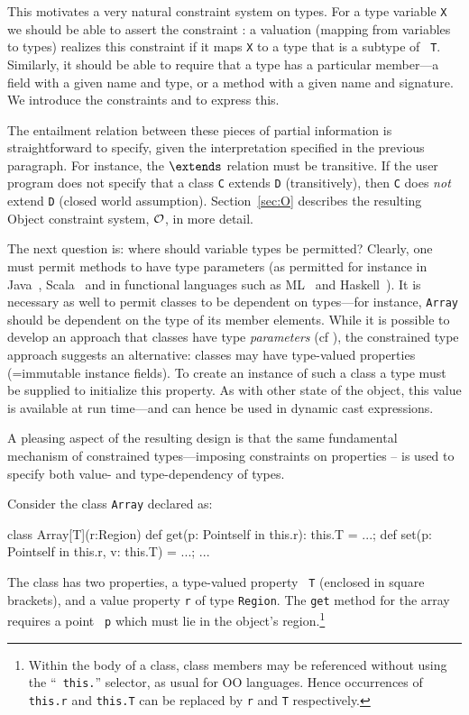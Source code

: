 This motivates a very natural constraint system on types.  For a type
variable {\tt X} we should be able to assert the constraint
 \subtype {}: a valuation (mapping from variables to types) realizes
this constraint if it maps {\tt X} to a type that is a subtype of {\tt
T}. Similarly, it should be able to require that a type has a
particular member---a field with a given name and type, or a method
with a given name and signature. We introduce the constraints
 and  to express this.

The entailment relation between these pieces of partial information is
straightforward to specify, given the interpretation specified in the
previous paragraph. For instance, the $\extends$ relation must be
transitive. If the user program does not specify that a class {\tt C}
extends {\tt D} (transitively), then {\tt C} does {\em not} extend
{\tt D} (closed world assumption). Section~\ref{sec:O} describes the
resulting Object constraint system, $\cal O$, in more detail.

The next question is: where should variable types be permitted?
Clearly, one must permit methods to have type parameters (as permitted
for instance in Java~\cite{Java3}, Scala~\cite{scala} and in
functional languages such as ML~\cite{ml} and Haskell~\cite{haskell}).
It is necessary as well to permit classes to be dependent on
types---for instance, {\tt Array} should be dependent on the type of its
member elements. While it is possible to develop an approach that
classes have type {\em parameters} (cf \cite{Java3}), the constrained
type approach suggests an alternative: classes may have type-valued
properties (=immutable instance fields). To create an instance of such
a class a type must be supplied to initialize this property. As with
other state of the object, this value is available at run time---and
can hence be used in dynamic cast expressions.

A pleasing aspect of the resulting design is that the same fundamental
mechanism of constrained types---imposing constraints on properties
-- is used to specify both value- and type-dependency of types.

\begin{example}[Array]
  Consider the class {\tt Array} declared as:
{\footnotesize
\begin{xten}
class Array[T](r:Region) {
  def get(p: Point{self in this.r}): this.T = ...;
  def set(p: Point{self in this.r}, v: this.T) = ...;
  ...
}
\end{xten}}
{}\noindent The class has two properties, a type-valued property {\tt
T} (enclosed in square brackets), and a value property {\tt r} of type
{\tt Region}. The {\tt get} method for the array requires a point {\tt
p} which must lie in the object's region.\footnote{Within the body of
a class, class members may be referenced without using the ``{\tt
this.}'' selector, as usual for OO languages. Hence occurrences of
{\tt this.r} and {\tt this.T} can be replaced by {\tt r} and {\tt T}
respectively.}
\end{example}

